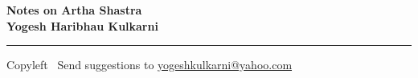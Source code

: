 
\usepackage{polyglossia}
\setdefaultlanguage{sanskrit}

\usepackage{fontspec}
\setmainfont{Segoe UI}
\newfontfamily{}
\newfontfamily{}


\graphicspath{{images/}}



\footnotesize


\begin{center}
\Large{\textbf{Notes on Artha Shastra\\ Yogesh Haribhau Kulkarni}}  
\end{center}

\begin{multicols}{2}

\end{multicols}

\rule{\linewidth}{0.25pt}
\scriptsize
Copyleft \textcopyleft\  Send suggestions to 
\href{http://www.yogeshkulkarni.com}{yogeshkulkarni@yahoo.com}


